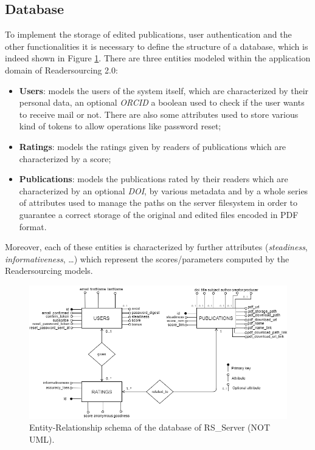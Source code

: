 \documentclass[a4paper, english]{article}
\begin{document}
\subsection{Database}

To implement the storage of edited publications, user authentication and the other functionalities it is necessary to define the structure of a database, which is indeed shown in Figure \ref{fig:er}. There are three entities modeled within the application domain of Readersourcing 2.0:

\begin{itemize}
\item \textbf{Users}: models the users of the system itself, which are characterized by their personal data, an optional \emph{ORCID} a boolean used to check if the user wants to receive mail or not. There are also some attributes used to store various kind of tokens to allow operations like password reset;
\item \textbf{Ratings}: models the ratings given by readers of publications which are characterized by a score;
\item \textbf{Publications}: models the publications rated by their readers which are characterized by an optional \emph{DOI}, by various metadata and by a whole series of attributes used to manage the paths on the server filesystem in order to guarantee a correct storage of the original and edited files encoded in PDF format. 
\end{itemize}
Moreover, each of these entities is characterized by further attributes (\emph{steadiness}, \emph{informativeness}, \dots) which represent the scores/parameters computed by the Readersourcing models.

\begin{figure}[!tbp]
\centering
\includegraphics[width=\textwidth]{figures/er.png}
\caption{Entity-Relationship schema of the database of RS\_Server (NOT UML).}
\label{fig:er}
\end{figure}
\end{document}

